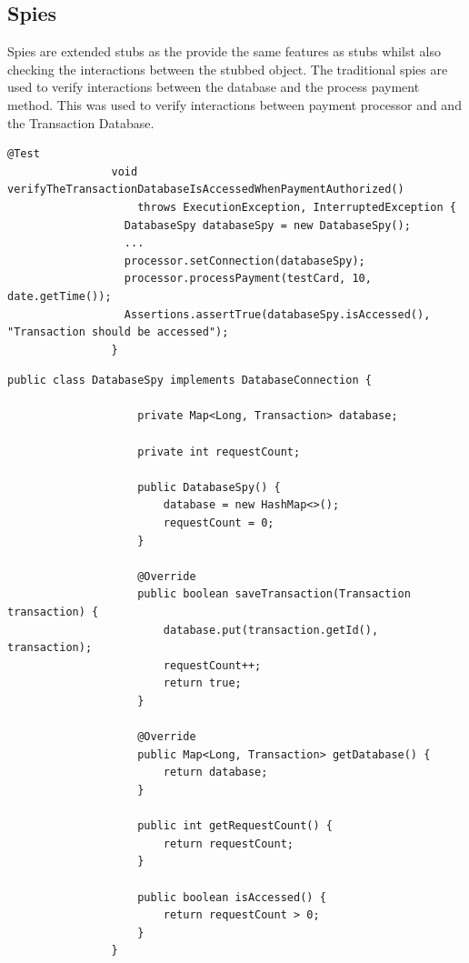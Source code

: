 \documentclass[11pt, a4paper]{article}
\begin{document}
        \subsection{Spies}
            Spies are extended stubs as the provide the same features as stubs whilst also checking the interactions between the stubbed object. The traditional spies are used to verify interactions between the database and the process payment method. This was used to verify interactions between payment processor and and the Transaction Database. 
            \begin{lstlisting}[caption="Using the database spy in the test suite"]
                @Test
                void verifyTheTransactionDatabaseIsAccessedWhenPaymentAuthorized()
                    throws ExecutionException, InterruptedException {
                  DatabaseSpy databaseSpy = new DatabaseSpy();
                  ...
                  processor.setConnection(databaseSpy);
                  processor.processPayment(testCard, 10, date.getTime());
                  Assertions.assertTrue(databaseSpy.isAccessed(), "Transaction should be accessed");
                } 
            \end{lstlisting}
            \begin{lstlisting}[caption=The database spy impmplemention]
                public class DatabaseSpy implements DatabaseConnection {

                    private Map<Long, Transaction> database;

                    private int requestCount;

                    public DatabaseSpy() {
                        database = new HashMap<>();
                        requestCount = 0;
                    }

                    @Override
                    public boolean saveTransaction(Transaction transaction) {
                        database.put(transaction.getId(), transaction);
                        requestCount++;
                        return true;
                    }

                    @Override
                    public Map<Long, Transaction> getDatabase() {
                        return database;
                    }

                    public int getRequestCount() {
                        return requestCount;
                    }

                    public boolean isAccessed() {
                        return requestCount > 0;
                    }
                }
            \end{lstlisting}
\end{document}
